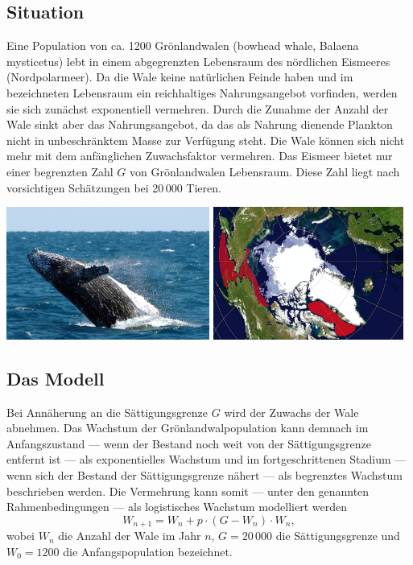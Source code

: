 \documentclass[%
11pt,%
twoside,%
titlepage,%
german,%
headsepline%
]{scrartcl}
\begin{document}
\subsection{Situation}
Eine
Population von ca. 1200 Grönlandwalen (bowhead whale, Balaena mysticetus) lebt in einem abgegrenzten Lebensraum des nördlichen Eismeeres (Nordpolarmeer). Da die Wale keine natürlichen Feinde haben und im bezeichneten Lebensraum ein reichhaltiges Nahrungsangebot vorfinden, werden sie sich zunächst exponentiell vermehren. Durch die Zunahme der Anzahl der Wale sinkt aber das Nahrungsangebot, da das als Nahrung dienende Plankton nicht in unbeschränktem Masse zur Verfügung steht. Die Wale können sich nicht mehr mit dem anfänglichen Zuwachsfaktor vermehren. Das Eismeer bietet nur einer begrenzten Zahl $G$ von Grönlandwalen Lebensraum. Diese Zahl liegt nach vorsichtigen Schätzungen bei 20\,000 Tieren.\\[2ex]

\begin{center}
\includegraphics[width=0.5\textwidth]{pictures/groenlandwale.jpeg}
\includegraphics[width=0.4685\textwidth]{pictures/groenlandwalegebiet.jpg}
\end{center}


\subsection{Das Modell}
Bei Annäherung an die Sättigungsgrenze $G$ wird der Zuwachs der Wale abnehmen. Das Wachstum der Grönlandwalpopulation kann demnach im Anfangszustand --- wenn der Bestand noch weit von der Sättigungsgrenze entfernt ist --- als exponentielles Wachstum und im fortgeschrittenen Stadium --- wenn sich der Bestand der Sättigungsgrenze nähert --- als begrenztes Wachstum beschrieben werden. Die Vermehrung kann somit --- unter den genannten Rahmenbedingungen --- als logistisches Wachstum modelliert werden
$$W_{n+1}=W_n+p\cdot (G-W_n)\cdot W_n,$$
wobei $W_n$ die Anzahl der Wale im Jahr $n$, $G=20\,000$ die Sättigungsgrenze und $W_0=1200$ die Anfangspopulation bezeichnet.
\end{document}
